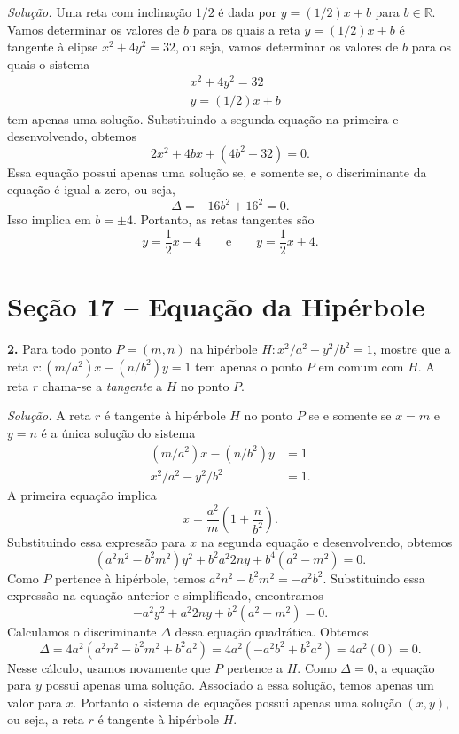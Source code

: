 \documentclass[a4paper,11pt]{article}
\newcommand{\R}{\mathbb{R}}
\begin{document}
\emph{Solução.}
Uma reta com inclinação $1/2$ é dada por $y = (1/2)x + b$ para $b \in \R$.
Vamos determinar os valores de $b$ para os quais a reta $y = (1/2)x + b$ é tangente à elipse $x^2 + 4y^2 = 32$, ou seja, vamos determinar os valores de $b$ para os quais o sistema
\begin{align*}
  & x^2 + 4y^2 = 32 \\
  & y = (1/2)x + b
\end{align*}
tem apenas uma solução.
Substituindo a segunda equação na primeira e desenvolvendo, obtemos
\[
  2x^2 + 4bx + (4b^2 - 32) = 0.
\]
Essa equação possui apenas uma solução se, e somente se, o discriminante da equação é igual a zero, ou seja,
\[
  \Delta = -16b^2 + 16^2 = 0.
\]
Isso implica em $b = \pm 4$.
Portanto, as retas tangentes são
\[
  y = \frac{1}{2} x - 4 \qquad \text{e} \qquad y = \frac{1}{2} x + 4.
\]

\section*{Seção 17 -- Equação da Hipérbole}

\textbf{2.}
Para todo ponto $P = (m,n)$ na hipérbole $H : x^2/a^2 - y^2/b^2 = 1$, mostre que a reta $r: (m/a^2)x - (n/b^2)y = 1$ tem apenas o ponto $P$ em comum com $H$.
A reta $r$ chama-se a \emph{tangente} a $H$ no ponto $P$.

\vspace{\baselineskip}

\emph{Solução.}
A reta $r$ é tangente à hipérbole $H$ no ponto $P$ se e somente se $x = m$ e $y = n$ é a única solução do sistema
\begin{align*}
  (m/a^2) x - (n/b^2) y & = 1 \\
  x^2/a^2 - y^2/b^2 & = 1.
\end{align*}
A primeira equação implica
\[
  x = \frac{a^2}{m} \left( 1 + \frac{n}{b^2} \right).
\]
Substituindo essa expressão para $x$ na segunda equação e desenvolvendo, obtemos
\[
  (a^2 n^2 - b^2 m^2) y^2 + b^2 a^2 2ny + b^4(a^2 - m^2) = 0.
\]
Como $P$ pertence à hipérbole, temos $a^2 n^2 - b^2 m^2 = -a^2 b^2$.
Substituindo essa expressão na equação anterior e simplificado, encontramos
\[
  -a^2 y^2 + a^2 2ny + b^2 (a^2 - m^2) = 0.
\]
Calculamos o discriminante $\Delta$ dessa equação quadrática.
Obtemos
\[
  \Delta = 4 a^2 ( a^2 n^2 - b^2 m^2 + b^2 a^2 ) = 4 a^2 (-a^2 b^2 + b^2 a^2 ) = 4 a^2 (0) = 0.
\]
Nesse cálculo, usamos novamente que $P$ pertence a $H$.
Como $\Delta = 0$, a equação para $y$ possui apenas uma solução.
Associado a essa solução, temos apenas um valor para $x$.
Portanto o sistema de equações possui apenas uma solução $(x,y)$, ou seja, a reta $r$ é tangente à hipérbole $H$.
\end{document}
